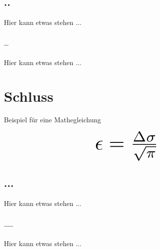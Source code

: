 \documentclass[a4paper, 12pt]{article}
\begin{document}
\subsection{..}
Hier kann etwas stehen ...

\subsubsection{--}
Hier kann etwas stehen ...

\newpage
\section{Schluss}
Beispiel für eine Mathegleichung

\begin{displaymath}
\scalebox{3}{$\epsilon = \frac{\Delta\sigma}{\sqrt{\pi}}$}
\end{displaymath}

\subsection{...}
Hier kann etwas stehen ...

\subsubsection{---}
Hier kann etwas stehen ...



\end{document}

